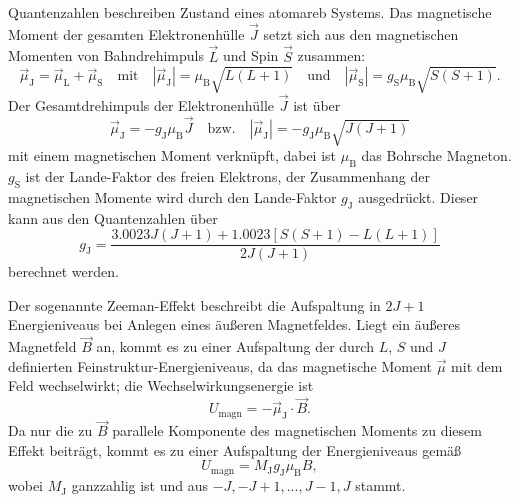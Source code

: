 Quantenzahlen beschreiben Zustand eines atomareb Systems.
Das magnetische Moment der gesamten Elektronenhülle $\vec{J}$ setzt sich aus den magnetischen Momenten von
Bahndrehimpuls $\vec{L}$ und Spin $\vec{S}$ zusammen:
\begin{equation}
  \vec{\mu}_\text{J} = \vec{\mu}_\text{L} + \vec{\mu}_\text{S} \quad \text{mit} \quad |\vec{\mu}_\text{J}| = \mu_\text{B}\sqrt{L (L + 1)} \quad \text{und}
  \quad |\vec{\mu}_\text{S}| = g_\text{S}\mu_\text{B}\sqrt{S (S + 1)}.
\end{equation}
Der Gesamtdrehimpuls der Elektronenhülle $\vec{J}$ ist über
\begin{equation}
  \vec{\mu}_\text{J} = -g_\text{J}\mu_\text{B}\vec{J} \quad \text{bzw.} \quad |\vec{\mu}_\text{J}| = -g_\text{J}\mu_\text{B}\sqrt{J (J + 1)}
  \label{magnMom}
\end{equation}
mit einem magnetischen Moment verknüpft, dabei ist $\mu_\text{B}$ das Bohrsche Magneton.
$g_\text{S}$ ist der Lande-Faktor des freien Elektrons, der Zusammenhang der magnetischen Momente wird durch den
Lande-Faktor $g_\text{J}$ ausgedrückt.
Dieser kann aus den Quantenzahlen über
\begin{equation}
  g_\text{J} = \frac{3.0023J(J+1) + 1.0023[S(S+1) - L(L+1)]}{2J(J+1)}
\end{equation}
berechnet werden.

Der sogenannte Zeeman-Effekt beschreibt die Aufspaltung in $2J+1$ Energieniveaus bei Anlegen eines äußeren
Magnetfeldes. Liegt ein äußeres Magnetfeld $\vec{B}$ an, kommt es zu einer Aufspaltung der durch $L$, $S$ und
$J$ definierten Feinstruktur-Energieniveaus, da das magnetische Moment $\vec{\mu}$ mit dem Feld wechselwirkt; die
Wechselwirkungsenergie ist
\begin{equation}
  U_\text{magn} = -\vec{\mu}_\text{J}\cdot\vec{B}.
\end{equation}
Da nur die zu $\vec{B}$ parallele Komponente des magnetischen Moments zu diesem Effekt beiträgt, kommt es zu einer Aufspaltung
der Energieniveaus gemäß
\begin{equation}
  U_\text{magn} = M_\text{J}g_\text{J}\mu_\text{B}B,
\end{equation}
wobei $M_\text{J}$ ganzzahlig ist und aus $-J, -J+1, ..., J-1, J$ stammt.

